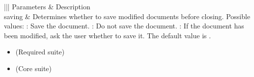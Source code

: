 \documentclass[letterpaper,12pt,english,openany,oneside]{sphinxmanual}
\begin{document}
\label{\detokenize{IAC_API_AppleEvtObjects:syntax-15}}

\begin{sphinxVerbatim}[commandchars=\\\{\}]
  
 \PYG{p}{[}\PYG{p}{]}
\end{sphinxVerbatim}
\label{\detokenize{IAC_API_AppleEvtObjects:parameters-15}}


\begin{savenotes}\sphinxattablestart
\centering
{}\label{\detokenize{IAC_API_AppleEvtObjects:section-30}}\nobreak
\begin{tabular}[t]{|||}
\hline
\sphinxstyletheadfamily 
Parameters
&\sphinxstyletheadfamily 
Description
\\
\hline
saving
&
Determines whether to save modified documents before closing. Possible values:  : Save the document.  : Do not save the document.  : If the document has been modified, ask the user whether to save it.  The default value is .
\\
\hline
\end{tabular}
\par
\sphinxattableend\end{savenotes}
\label{\detokenize{IAC_API_AppleEvtObjects:related-events-7}}
\begin{itemize}
\item {} 
 (Required suite)

\item {} 
 (Core suite)

\end{itemize}
\label{\detokenize{IAC_API_AppleEvtObjects:applescript-example-11}}

\begin{sphinxVerbatim}[commandchars=\\\{\}]
  
\end{sphinxVerbatim}
\label{\detokenize{IAC_API_AppleEvtObjects:apple-event-id-2}}
\end{document}
